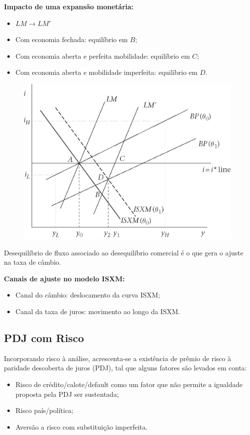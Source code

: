 \documentclass[a4paper,12pt]{article}[abntex2]
\begin{document}
\textbf{Impacto de uma expansão monetária:}
\begin{itemize}
  \item $LM \rightarrow LM'$
  \item Com economia fechada: equilíbrio em $B$;
  \item Com economia aberta e perfeita mobilidade: equilíbrio em $C$;
  \item Com economia aberta e mobilidade imperfeita: equilíbrio em $D$.
\end{itemize}

\begin{figure}[H]
    \centering
    \includegraphics[width=0.7\linewidth]{Imagens/a24i2.png}
\end{figure}

Desequilíbrio de fluxo associado ao desequilíbrio comercial é o que gera o ajuste na taxa de câmbio.

\textbf{Canais de ajuste no modelo ISXM:}
\begin{itemize}
  \item Canal do câmbio: deslocamento da curva ISXM;
  \item Canal da taxa de juros: movimento ao longo da ISXM.
\end{itemize}

\subsection{\textbf{PDJ com Risco}}
Incorporando risco à análise, acrescenta-se a existência de prêmio de risco à paridade descoberta de juros (PDJ), tal que alguns fatores são levados em conta:
\begin{itemize}
  \item Risco de crédito/calote/default como um fator que não permite a igualdade proposta pela PDJ ser sustentada;
  \item Risco país/política;
  \item Aversão a risco com substituição imperfeita.
\end{itemize}
\end{document}
